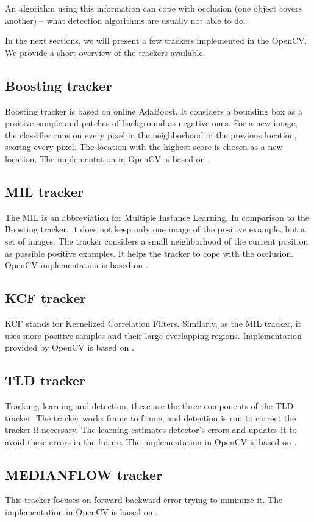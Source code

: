 An algorithm using this information can cope with occlusion (one object covers
another) -- what detection algorithms are usually not able to do.

In the next sections, we will present a few trackers implemented in the OpenCV. We
provide a short overview of the trackers available.

\subsection*{Boosting tracker}
Boosting tracker is based on online AdaBoost. It considers a bounding box as
a positive sample and patches of background as negative ones. For a new image, the
classifier runs on every pixel in the neighborhood of the previous location,
scoring every pixel. The location with the highest score is chosen as a new
location. The implementation in OpenCV is based on \citet*{boosting}.

\subsection*{MIL tracker}
The MIL is an abbreviation for Multiple Instance Learning. In comparison to the
Boosting tracker, it does not keep only one image of the positive example, but a
set of images. The tracker considers a small neighborhood of the
current position as possible positive examples. It helps the tracker to cope with
the occlusion. OpenCV implementation is based on \citet*{mil}.

\subsection*{KCF tracker}
KCF stands for Kernelized Correlation Filters. Similarly, as the MIL tracker,
it uses more positive samples and their large overlapping regions.
Implementation provided by OpenCV is based on \citet*{kcf}.

\subsection*{TLD tracker}
Tracking, learning and detection, these are the three components of the TLD
tracker. The tracker works frame to frame, and detection is run to correct the
tracker if necessary. The learning estimates detector's errors and updates it
to avoid these errors in the future. The implementation in OpenCV is based on
\citet*{tld}.

\subsection*{MEDIANFLOW tracker}
This tracker focuses on forward-backward error trying to minimize it. The
implementation in OpenCV is based on \citet*{medianflow}.

